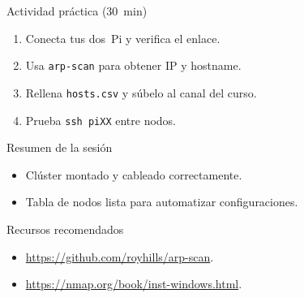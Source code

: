 \documentclass[aspectratio=169,professionalfonts]{beamer}
\begin{document}
\begin{frame}[fragile]{Actividad práctica (30 min)}
  \begin{enumerate}
    \item Conecta tus dos Pi y verifica el enlace.
    \item Usa \texttt{arp-scan} para obtener IP y hostname.
    \item Rellena \texttt{hosts.csv} y súbelo al canal del curso.
    \item Prueba \texttt{ssh piXX} entre nodos.
  \end{enumerate}
\end{frame}

\begin{frame}[fragile]{Resumen de la sesión}
  \begin{itemize}
    \item Clúster montado y cableado correctamente.
    \item Tabla de nodos lista para automatizar configuraciones.
  \end{itemize}
\end{frame}

\begin{frame}[fragile]{Recursos recomendados}
  \begin{itemize}
    \item \url{https://github.com/royhills/arp-scan}.
    \item \url{https://nmap.org/book/inst-windows.html}.
  \end{itemize}
\end{frame}
\end{document}
